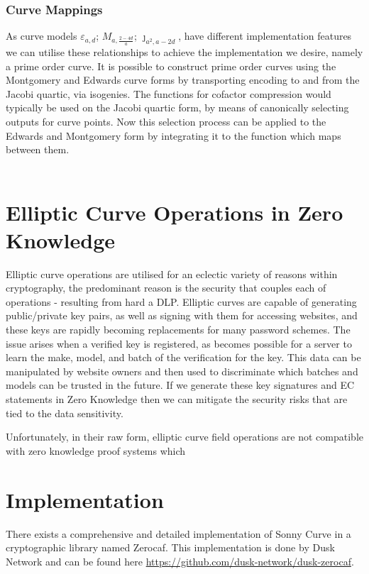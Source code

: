 \documentclass{article}
\theoremstyle{definition}
\theoremstyle{remark}
\begin{document}
	\subsubsection {Curve Mappings}
	
	As curve models $\varepsilon_{a,d}$; ${M}_{a,\frac{2-4d}{a}}$; $\jmath_{a^{2},a-{2d}}$, have different implementation features we can utilise these relationships to achieve the implementation we desire, namely a prime order curve. It is possible to construct prime order curves using the Montgomery and Edwards curve forms by transporting encoding to and from the Jacobi quartic, via isogenies. The functions for cofactor compression would typically be used on the Jacobi quartic form, by means of canonically selecting outputs for curve points. Now this selection process can be applied to the Edwards and Montgomery form by integrating it to the function which maps between them. \\\\ 
	
	\section{Elliptic Curve Operations in Zero Knowledge}
	
	Elliptic curve operations are utilised for an eclectic variety of reasons within cryptography, the predominant reason is the security that couples each of operations - resulting from hard a DLP. Elliptic curves are capable of generating public/private key pairs, as well as signing with them for accessing websites, and these keys are rapidly becoming replacements for many password schemes. The issue arises when a verified key is registered, as becomes possible for a server to learn the make, model, and batch of the verification for the key. This data can be manipulated by website owners and then used to discriminate which batches and models can be trusted in the future. If we generate these key signatures and EC statements in Zero Knowledge then we can mitigate the security risks that are tied to the data sensitivity. 
	
	Unfortunately, in their raw form, elliptic curve field operations are not compatible with zero knowledge proof systems which  
	
	\section{Implementation}
	
	There exists a comprehensive and detailed implementation of Sonny Curve in a cryptographic library named Zerocaf. This implementation is done by Dusk Network and can be found here {\url{https://github.com/dusk-network/dusk-zerocaf}}.\\\\  
	
\end{document}
